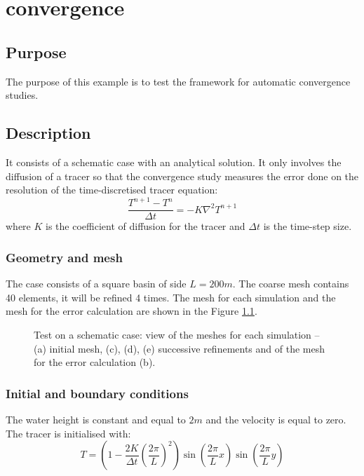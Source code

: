 \chapter{convergence}

\section{Purpose}
The purpose of this example is to test the framework for automatic
convergence studies.

\section{Description}
It consists of a schematic case with an analytical solution.
It only involves the diffusion of a tracer so that the convergence study
measures the error done on the resolution of the time-discretised
tracer equation:
\begin{equation}
\dfrac{T^{n+1} - T^{n}}{\Delta t} = -K \nabla^2 T^{n+1}
\end{equation}
where $K$ is the coefficient of diffusion for the tracer
and $\Delta t$ is the time-step size.

\subsection{Geometry and mesh}
The case consists of a square basin of side $L=200m$.
The coarse mesh contains 40 elements, it will be refined 4 times.
The mesh for each simulation and the mesh for
the error calculation are shown in the Figure \ref{fig:figure1}.

\begin{figure}
  \begin{center}
    \caption{Test on a schematic case: view of the meshes for each simulation
    -- (a) initial mesh, (c), (d), (e) successive refinements and
    of the mesh for the error calculation (b).}
    \label{fig:figure1}
  \end{center}
\end{figure}

\subsection{Initial and boundary conditions}
The water height is constant and equal to $2m$ and the velocity
is equal to zero.
The tracer is initialised with:
\begin{equation}
T = \left(1 - \dfrac{2 K}{\Delta t}\left(\dfrac{2 \pi}{L}\right)^2 \right)
\sin \left(\dfrac{2 \pi}{L}x \right)
\sin \left( \dfrac{2 \pi}{L}y\right)
\end{equation}

